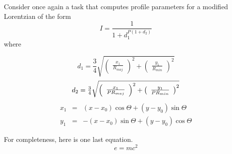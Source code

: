 \documentclass[manuscript]{../aastex52/aastex}
\begin{document}
Consider once again a task that computes profile parameters for a modified
Lorentzian of the form
\begin{equation}
I = \frac{1}{1 + d_{1}^{P (1 + d_{2} )}}
\end{equation}
where
\begin{mathletters}
\begin{displaymath}
d_{1} = \frac{3}{4} \sqrt{ \left( \begin{array}{c} \frac{x_{1}}{R_{maj}}
\end{array} \right) ^{2} +
\left( \begin{array}{c} \frac{y_{1}}{R_{min}} \end{array} \right) ^{2} }
\end{displaymath}
\begin{equation}
d_{2} = \mbox{$\frac{3}{4}$} \sqrt{ \left( \begin{array}{c} \frac{x_{1}}{P R_{maj}}
\end{array} \right) ^{2} +
\left( \begin{array}{c} \mbox{$\frac{y_{1}}{P R_{min}}$} \end{array} \right) ^{2} }
\end{equation}
\begin{eqnarray}
x_{1} & = & (x - x_{0}) \cos \Theta + (y - y_{0}) \sin \Theta \\
y_{1} & = & -(x - x_{0}) \sin \Theta + (y - y_{0}) \cos \Theta
\end{eqnarray}
\end{mathletters}

For completeness, here is one last equation.
\begin{equation}
e = mc^2
\end{equation}

\end{document}
